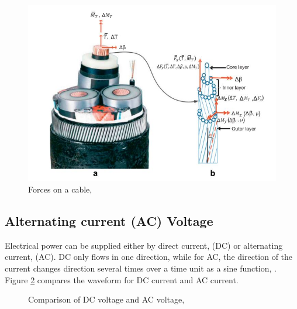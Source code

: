 \begin{figure}[H]
\centering
\includegraphics[scale=0.8]{figures/cable}
\caption[$\; \:$Forces on a cable]{Forces on a cable,  \cite{Nasution2013} }
 \label{fig:cable}
\end{figure}

\subsection{Alternating current (AC) Voltage}
Electrical power can be supplied either by direct current, (DC) or alternating current, (AC). DC only flows in one direction, while for AC, the direction of the current changes direction several times over a time unit as a sine function, \cite{Dale2000}. Figure \ref{fig:acdc} compares the waveform for DC current and AC current.


\begin{figure}[H]
\hfill
{}\hfill
\caption[$\; \:$Comparison of DC voltage and AC voltage]{Comparison of DC voltage and AC voltage, \cite{Dale2000}}
\label{fig:acdc}
\end{figure}

